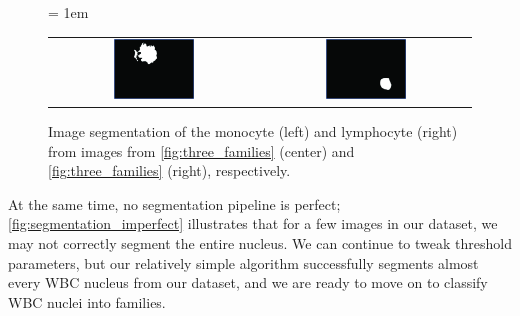\begin{figure}[h]
\centering
\tabcolsep = 1em
\mySfFamily
\begin{tabular}{c c}
\includegraphics[width = 0.4\textwidth]{../images_CMYK/monocyte_binarized} & \includegraphics[width = 0.4\textwidth]{../images_CMYK/lymphocyte_binarized}
\end{tabular}
\caption{Image segmentation of the monocyte (left) and lymphocyte (right) from images from \autoref{fig:three_families} (center) and \autoref{fig:three_families} (right), respectively.}
\label{fig:segmentation}
\end{figure}

At the same time, no segmentation pipeline is perfect; \autoref{fig:segmentation_imperfect} illustrates that for a few images in our dataset, we may not correctly segment the entire nucleus. We can continue to tweak threshold parameters, but our relatively simple algorithm successfully segments almost every WBC nucleus from our dataset, and we are ready to move on to classify WBC nuclei into families.\\

